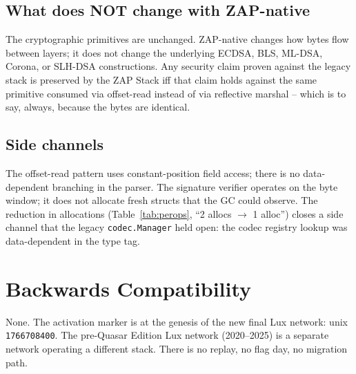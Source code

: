 \subsection{What does NOT change with ZAP-native}

The cryptographic primitives are unchanged. ZAP-native changes how
bytes flow between layers; it does not change the underlying ECDSA,
BLS, ML-DSA, Corona, or SLH-DSA constructions. Any security claim
proven against the legacy stack is preserved by the ZAP Stack iff
that claim holds against the same primitive consumed via offset-read
instead of via reflective marshal -- which is to say, always, because
the bytes are identical.

\subsection{Side channels}

The offset-read pattern uses constant-position field access; there
is no data-dependent branching in the parser. The signature verifier
operates on the byte window; it does not allocate fresh structs that
the GC could observe. The reduction in allocations (Table~\ref{tab:perops},
``2 allocs $\to$ 1 alloc'') closes a side channel that the legacy
\texttt{codec.Manager} held open: the codec registry lookup was
data-dependent in the type tag.

\section{Backwards Compatibility}

None. The activation marker is at the genesis of the new final Lux
network: unix \texttt{1766708400}. The pre-Quasar Edition Lux network
(2020--2025) is a separate network operating a different stack. There
is no replay, no flag day, no migration path.
